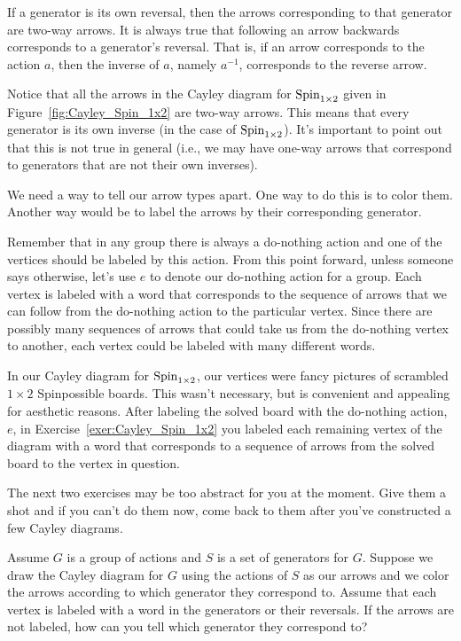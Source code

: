 If a generator is its own reversal, then the arrows corresponding to that generator are two-way arrows.  It is always true that following an arrow backwards corresponds to a generator's reversal.  That is, if an arrow corresponds to the action $a$, then the inverse of $a$, namely $a^{-1}$, corresponds to the reverse arrow. 

Notice that all the arrows in the Cayley diagram for $\operatorname{Spin}_{1\times 2}$ given in Figure~\ref{fig:Cayley_Spin_1x2} are two-way arrows.  This means that every generator is its own inverse (in the case of $\operatorname{Spin}_{1\times 2}$).  It's important to point out that this is not true in general (i.e., we may have one-way arrows that correspond to generators that are not their own inverses).

We need a way to tell our arrow types apart.  One way to do this is to color them.  Another way would be to label the arrows by their corresponding generator.

Remember that in any group there is always a do-nothing action and one of the vertices should be labeled by this action.  From this point forward, unless someone says otherwise, let's use $e$ to denote our do-nothing action for a group.  Each vertex is labeled with a word that corresponds to the sequence of arrows that we can follow from the do-nothing action to the particular vertex.  Since there are possibly many sequences of arrows that could take us from the do-nothing vertex to another, each vertex could be labeled with many different words.

In our Cayley diagram for $\operatorname{Spin}_{1\times 2}$, our vertices were fancy pictures of scrambled $1\times 2$ Spinpossible boards.  This wasn't necessary, but is convenient and appealing for aesthetic reasons.  After labeling the solved board with the do-nothing action, $e$, in Exercise~\ref{exer:Cayley_Spin_1x2} you labeled each remaining vertex of the diagram with a word that corresponds to a sequence of arrows from the solved board to the vertex in question.

The next two exercises may be too abstract for you at the moment.  Give them a shot and if you can't do them now, come back to them after you've constructed a few Cayley diagrams.

\begin{exercise}\label{exer:understanding_arrows}
Assume $G$ is a group of actions and $S$ is a set of generators for $G$. Suppose we draw the Cayley diagram for $G$ using the actions of $S$ as our arrows and we color the arrows according to which generator they correspond to.  Assume that each vertex is labeled with a word in the generators or their reversals.  If the arrows are not labeled, how can you tell which generator they correspond to?
\end{exercise}

